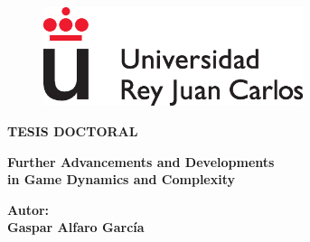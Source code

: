 \documentclass[a4paper,12pt]{newsiambook}
\begin{document}
\begin{center}

\begin{figure}
\centering
\includegraphics[clip,width=7.6cm,trim=0cm 0cm 0cm 0cm]{Images/logoURJC.eps}                        %
\end{figure}


\vspace*{1.5cm}

\begin{center}                                                    %
{\Huge {\bf TESIS DOCTORAL}}
\end{center}

%
%




\vspace*{1.4cm}

\begin{center}                                                     %
	{\LARGE {\bf Further Advancements and Developments}} \\
			\vspace*{0.25cm}
	{\LARGE {\bf in Game Dynamics and Complexity }}
\end{center}

\vspace*{1.2cm}







\begin{center}
 { \bf Autor: \\
 	\vspace*{0.25cm}
 \large Gaspar Alfaro García}
\end{center}


\end{center}
\end{document}
